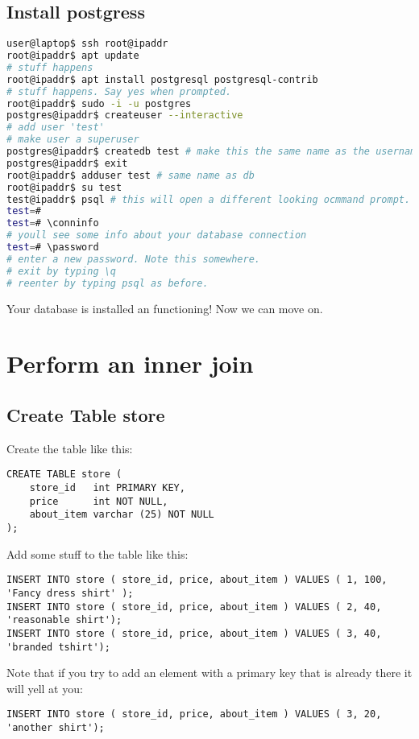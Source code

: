 \documentclass[12pt]{article}
\begin{document}
\subsection{Install postgress}
\begin{lstlisting}[language=bash]
user@laptop$ ssh root@ipaddr
root@ipaddr$ apt update
# stuff happens
root@ipaddr$ apt install postgresql postgresql-contrib
# stuff happens. Say yes when prompted.
root@ipaddr$ sudo -i -u postgres
postgres@ipaddr$ createuser --interactive
# add user 'test'
# make user a superuser
postgres@ipaddr$ createdb test # make this the same name as the username you created
postgres@ipaddr$ exit
root@ipaddr$ adduser test # same name as db
root@ipaddr$ su test
test@ipaddr$ psql # this will open a different looking ocmmand prompt. That is the postgres prompt
test=# 
test=# \conninfo
# youll see some info about your database connection
test=# \password
# enter a new password. Note this somewhere.
# exit by typing \q
# reenter by typing psql as before.
\end{lstlisting}

Your database is installed an functioning! Now we can move on.

\section{ Perform an inner join }

\subsection{Create Table store}
Create the table like this:
\begin{lstlisting}
CREATE TABLE store (
	store_id   int PRIMARY KEY,
	price      int NOT NULL,
	about_item varchar (25) NOT NULL
);
\end{lstlisting}

Add some stuff to the table like this:

\begin{lstlisting}
INSERT INTO store ( store_id, price, about_item ) VALUES ( 1, 100, 'Fancy dress shirt' );
INSERT INTO store ( store_id, price, about_item ) VALUES ( 2, 40, 'reasonable shirt');
INSERT INTO store ( store_id, price, about_item ) VALUES ( 3, 40, 'branded tshirt');
\end{lstlisting}

Note that if you try to add an element with a primary key that is already there it will yell at you:
\begin{lstlisting}
INSERT INTO store ( store_id, price, about_item ) VALUES ( 3, 20, 'another shirt');
\end{lstlisting}
\end{document}
